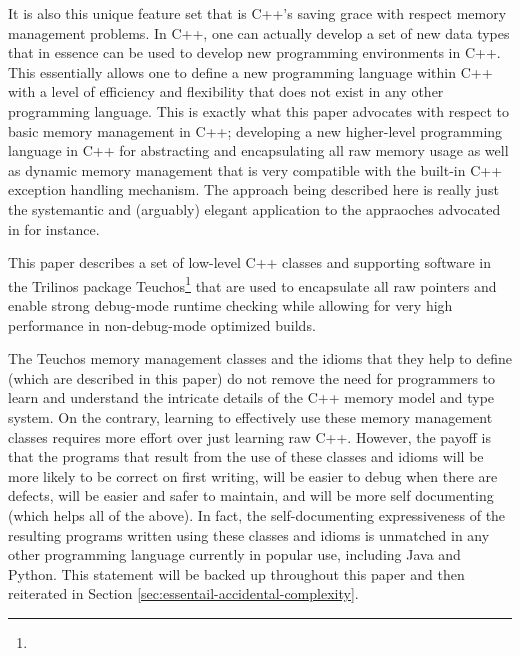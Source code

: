 \documentclass[pdf,ps2pdf,11pt]{SANDreport}
\begin{document}
It is also this unique feature set that is C++'s saving grace with
respect memory management problems.  In C++, one can actually develop
a set of new data types that in essence can be used to develop new
programming environments in C++.  This essentially allows one to
define a new programming language within C++ with a level of
efficiency and flexibility that does not exist in any other
programming language.  This is exactly what this paper advocates with
respect to basic memory management in C++; developing a new
higher-level programming language in C++ for abstracting and
encapsulating all raw memory usage as well as dynamic memory
management that is very compatible with the built-in C++ exception
handling mechanism.  The approach being described here is really just
the systemantic and (arguably) elegant application to the appraoches
advocated in {}\cite[Section 13.2: Pointers]{CodeComplete2nd04} for
instance.

This paper describes a set of low-level C++ classes and supporting
software in the Trilinos package
Teuchos\footnote{}
that are used to encapsulate all raw pointers and enable strong
debug-mode runtime checking while allowing for very high performance
in non-debug-mode optimized builds.

The Teuchos memory management classes and the idioms that they help to
define (which are described in this paper) do not remove the need for
programmers to learn and understand the intricate details of the C++
memory model and type system.  On the contrary, learning to
effectively use these memory management classes requires more effort
over just learning raw C++.  However, the payoff is that the programs
that result from the use of these classes and idioms will be more
likely to be correct on first writing, will be easier to debug when
there are defects, will be easier and safer to maintain, and will be
more self documenting (which helps all of the above).  In fact, the
self-documenting expressiveness of the resulting programs written
using these classes and idioms is unmatched in any other programming
language currently in popular use, including Java and Python.  This
statement will be backed up throughout this paper and then reiterated
in Section {}\ref{sec:essentail-accidental-complexity}.
\end{document}
